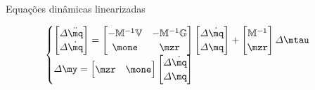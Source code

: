 \documentclass[25pt,landscape]{beamer}
\begin{document}
\begin{frame}{Equa\c{c}\~oes din\^amicas linearizadas}
    \begin{block}{}
		\begin{equation} \label{eq:SisLinSS}
			\begin{cases}
				\begin{bmatrix}
					\Delta\ddot{\mq} \\
					\Delta\dot{\mq} \\
				\end{bmatrix}
				=
				\begin{bmatrix}
					-\mM^{-1} \mV& -\mM^{-1} \mG \\
					\mone & \mzr
				\end{bmatrix}
				\begin{bmatrix}
					\Delta\dot{\mq} \\
					\Delta\mq \\
				\end{bmatrix}
				+
				\begin{bmatrix}
					\mM^{-1} \\
					\mzr
				\end{bmatrix} \Delta\mtau
				\\
				\Delta\my = \begin{bmatrix}
					\mzr & \mone
					\end{bmatrix}
				\begin{bmatrix}
					\Delta\dot{\mq} \\
					\Delta\mq \\
				\end{bmatrix}
			\end{cases}
		\end{equation}
    \end{block}
\end{frame}
\end{document}
